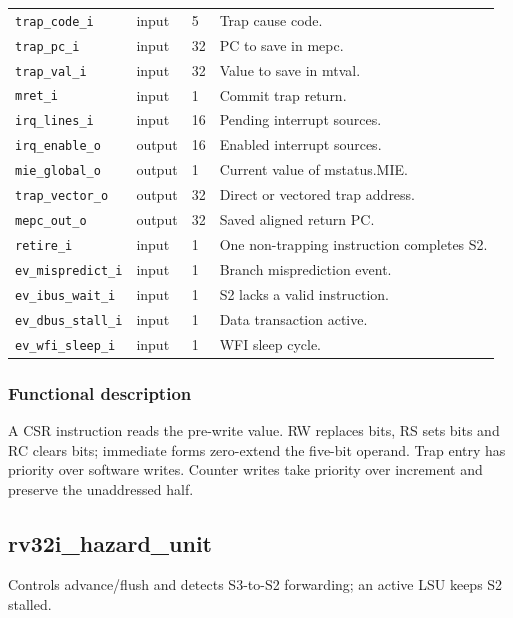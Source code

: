\documentclass[11pt]{article}
\begin{document}
{\begin{longtable}{@{}L{0.3400\dimexpr\linewidth-36pt\relax}L{0.1000\dimexpr\linewidth-36pt\relax}L{0.1000\dimexpr\linewidth-36pt\relax}L{0.4600\dimexpr\linewidth-36pt\relax}@{}}
\texttt{trap\_code\_i} & input & 5 & Trap cause code. \\ \addlinespace[3pt]
\texttt{trap\_pc\_i} & input & 32 & PC to save in mepc. \\ \addlinespace[3pt]
\texttt{trap\_val\_i} & input & 32 & Value to save in mtval. \\ \addlinespace[3pt]
\texttt{mret\_i} & input & 1 & Commit trap return. \\ \addlinespace[3pt]
\texttt{irq\_lines\_i} & input & 16 & Pending interrupt sources. \\ \addlinespace[3pt]
\texttt{irq\_enable\_o} & output & 16 & Enabled interrupt sources. \\ \addlinespace[3pt]
\texttt{mie\_global\_o} & output & 1 & Current value of mstatus.MIE. \\ \addlinespace[3pt]
\texttt{trap\_vector\_o} & output & 32 & Direct or vectored trap address. \\ \addlinespace[3pt]
\texttt{mepc\_out\_o} & output & 32 & Saved aligned return PC. \\ \addlinespace[3pt]
\texttt{retire\_i} & input & 1 & One non-trapping instruction completes S2. \\ \addlinespace[3pt]
\texttt{ev\_mispredict\_i} & input & 1 & Branch misprediction event. \\ \addlinespace[3pt]
\texttt{ev\_ibus\_wait\_i} & input & 1 & S2 lacks a valid instruction. \\ \addlinespace[3pt]
\texttt{ev\_dbus\_stall\_i} & input & 1 & Data transaction active. \\ \addlinespace[3pt]
\texttt{ev\_wfi\_sleep\_i} & input & 1 & WFI sleep cycle. \\*
\bottomrule\end{longtable}}
\subsubsection{Functional description}
\noindent A CSR instruction reads the pre-write value. RW replaces bits, RS sets bits and RC clears bits; immediate forms zero-extend the five-bit operand. Trap entry has priority over software writes. Counter writes take priority over increment and preserve the unaddressed half.\par\medskip

\subsection{rv32i\_hazard\_unit}
Controls advance/flush and detects S3-to-S2 forwarding; an active LSU keeps S2 stalled.
\end{document}
